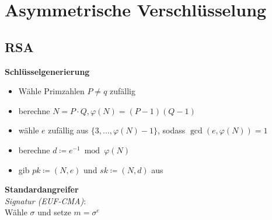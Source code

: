 \documentclass[10pt,a4paper]{article}
\begin{document}
        \section{Asymmetrische Verschlüsselung}
        \subsection{RSA}
        \textbf{Schlüsselgenerierung}
        \begin{itemize}
          \item Wähle Primzahlen \(P \neq q\) zufällig
          \item berechne \(N = P \cdot Q, \varphi(N) = (P-1)(Q-1)\)
          \item wähle \(e\) zufällig aus \(\{3,...,\varphi(N)-1\}\), sodass \(\gcd(e, \varphi(N)) = 1\)
          \item berechne \(d \coloneqq e^{-1} \bmod \varphi(N)\)
          \item gib \(\mathit{pk} \coloneqq (N, e)\) und \(\mathit{sk} \coloneqq (N, d)\) aus
        \end{itemize}
        \textbf{Standardangreifer}\\
        \textit{Signatur (EUF-CMA)}:\\
        Wähle \(\sigma\) und setze \(m = \sigma^e\)
\end{document}
